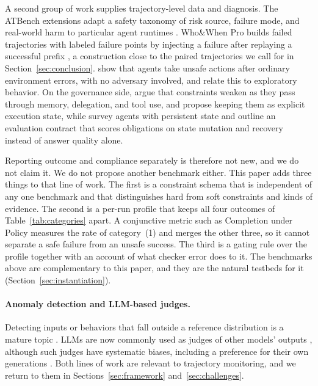 \documentclass{article}
\begin{document}
A second group of work supplies trajectory-level data and diagnosis. The ATBench extensions adapt a safety taxonomy of risk source, failure mode, and real-world harm to particular agent runtimes \citep{yang2026atbench}. Who\&When Pro builds failed trajectories with labeled failure points by injecting a failure after replaying a successful prefix \citep{liu2026whowhenpro}, a construction close to the paired trajectories we call for in Section~\ref{sec:conclusion}. \citet{jha2026meltdowns} show that agents take unsafe actions after ordinary environment errors, with no adversary involved, and relate this to exploratory behavior. On the governance side, \citet{li2026constraintdrift} argue that constraints weaken as they pass through memory, delegation, and tool use, and propose keeping them as explicit execution state, while \citet{ding2026alwayson} survey agents with persistent state and outline an evaluation contract that scores obligations on state mutation and recovery instead of answer quality alone.

Reporting outcome and compliance separately is therefore not new, and we do not claim it. We do not propose another benchmark either. This paper adds three things to that line of work. The first is a constraint schema that is independent of any one benchmark and that distinguishes hard from soft constraints and kinds of evidence. The second is a per-run profile that keeps all four outcomes of Table~\ref{tab:categories} apart. A conjunctive metric such as Completion under Policy measures the rate of category~(1) and merges the other three, so it cannot separate a safe failure from an unsafe success. The third is a gating rule over the profile together with an account of what checker error does to it. The benchmarks above are complementary to this paper, and they are the natural testbeds for it (Section~\ref{sec:instantiation}).

\paragraph{Anomaly detection and LLM-based judges.}
Detecting inputs or behaviors that fall outside a reference distribution is a mature topic \citep{chandola2009anomaly,hendrycks2017baseline}. LLMs are now commonly used as judges of other models' outputs \citep{zheng2023judging}, although such judges have systematic biases, including a preference for their own generations \citep{panickssery2024llm}. Both lines of work are relevant to trajectory monitoring, and we return to them in Sections~\ref{sec:framework} and~\ref{sec:challenges}.
\end{document}
